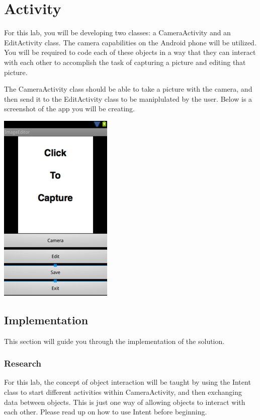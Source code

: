 \section{Activity}
\noindent
For this lab, you will be developing two classes: a CameraActivity and an EditActivity class. The camera capabilities on the Android phone will be utilized. You will be required to code each of these objects in a way that they can interact with each other to accomplish the task of capturing a picture and editing that picture.

\noindent
The CameraActivity class should be able to take a picture with the camera, and then send it to the EditActivity class to be maniplulated by the user. Below is a screenshot of the app you will be creating.

\begin{center}
\includegraphics[scale=0.4]{screenshot.png} 
\end{center}
\subsection{Implementation}
This section will guide you through the implementation of the solution.
\subsubsection{Research}
For this lab, the concept of object interaction will be taught by using the Intent class to start different activities within CameraActivity, and then exchanging data between objects. This is just one way of allowing objects to interact with each other. Please read up on how to use Intent before beginning.

